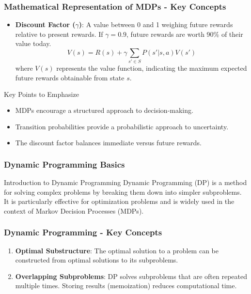 \documentclass{beamer}
\begin{document}
\begin{frame}[fragile]
    \frametitle{Mathematical Representation of MDPs - Key Concepts}
    \begin{itemize}
        \item \textbf{Discount Factor ($\gamma$)}: A value between 0 and 1 weighing future rewards relative to present rewards. If \( \gamma = 0.9 \), future rewards are worth 90\% of their value today. 
        \[
        V(s) = R(s) + \gamma \sum_{s' \in S} P(s' | s, a) V(s')
        \]
        where \( V(s) \) represents the value function, indicating the maximum expected future rewards obtainable from state \( s \).
    \end{itemize}
    

    \begin{block}{Key Points to Emphasize}
        \begin{itemize}
            \item MDPs encourage a structured approach to decision-making.
            \item Transition probabilities provide a probabilistic approach to uncertainty.
            \item The discount factor balances immediate versus future rewards.
        \end{itemize}
    \end{block}
\end{frame}

\begin{frame}[fragile]
    \frametitle{Dynamic Programming Basics}
    \begin{block}{Introduction to Dynamic Programming}
        Dynamic Programming (DP) is a method for solving complex problems by breaking them down into simpler subproblems. It is particularly effective for optimization problems and is widely used in the context of Markov Decision Processes (MDPs).
    \end{block}
\end{frame}

\begin{frame}[fragile]
    \frametitle{Dynamic Programming - Key Concepts}
    \begin{enumerate}
        \item \textbf{Optimal Substructure}: The optimal solution to a problem can be constructed from optimal solutions to its subproblems.
        \item \textbf{Overlapping Subproblems}: DP solves subproblems that are often repeated multiple times. Storing results (memoization) reduces computational time.
    \end{enumerate}
\end{frame}
\end{document}
